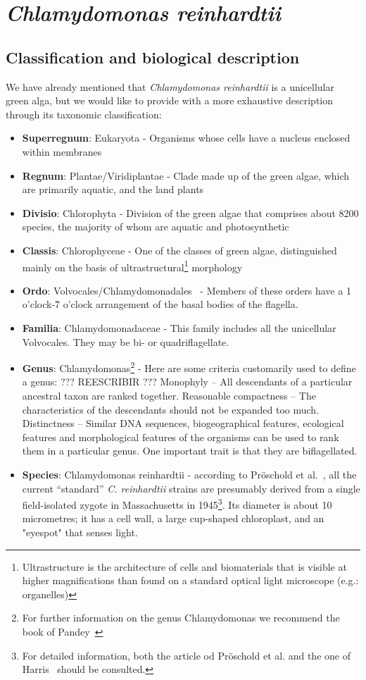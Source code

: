 \section{\textit{Chlamydomonas reinhardtii}}

\subsection{Classification and biological description}

We have already mentioned that \textit{Chlamydomonas reinhardtii}
is a unicellular green alga, but we would like to provide with a more exhaustive description through its taxonomic classification: 

\begin{itemize}
	\item \textbf{Superregnum}: Eukaryota - Organisms whose cells have a nucleus enclosed within membranes	
	\item \textbf{Regnum}: Plantae/Viridiplantae - Clade made up of the green algae, which are primarily aquatic, and the land plants
	\item \textbf{Divisio}: Chlorophyta - Division of the green algae that comprises about 8200 species, the majority of whom are aquatic and photosynthetic
	\item \textbf{Classis}: Chlorophyceae - One of the classes of green algae, distinguished mainly on the basis of ultrastructural\footnote{Ultrastructure is the architecture of cells and biomaterials that is visible at higher magnifications than found on a standard optical light microscope (e.g.: organelles)} morphology
	\item \textbf{Ordo}: Volvocales/Chlamydomonadales~\cite{chlorophyceae} - Members of these orders have a 1 o'clock-7 o'clock arrangement of the basal bodies of the flagella.
	\item \textbf{Familia}: Chlamydomonadaceae - This family includes all the unicellular Volvocales. They may be bi- or quadriflagellate.
	\item \textbf{Genus}: Chlamydomonas\footnote{For further information on the genus Chlamydomonas we recommend the book of Pandey~\cite{Pandey}} - Here are some criteria customarily used to define a genus:
	??? REESCRIBIR ???
		\subitem Monophyly – All descendants of a particular ancestral taxon are ranked together.
		\subitem Reasonable compactness – The characteristics of the descendants should not be expanded too much.
		\subitem Distinctness – Similar DNA sequences, biogeographical features, ecological features and morphological features of the organisms can be used to rank them in a particular genus. One important trait is that they are biflagellated.
	\item \textbf{Species}: Chlamydomonas reinhardtii - according to Pröschold et al.~\cite{Proschold}, all the current “standard” \textit{C. reinhardtii} strains are presumably derived from a single field-isolated zygote in Massachusetts in 1945\footnote{For detailed information, both the article od Pröschold et al. and the one of Harris~\cite{Harris} should be consulted.}. Its diameter is about 10 micrometres; it has a cell wall, a large cup-shaped chloroplast, and an "eyespot" that senses light. 
\end{itemize}

